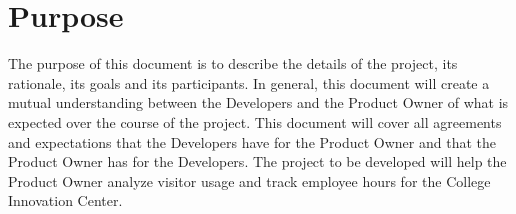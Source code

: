 \section{Purpose}

The purpose of this document is to describe the details of the project, its
rationale, its goals and its participants. In general, this document will create
a mutual understanding between the Developers and the Product Owner of what is
expected over the course of the project. This document will cover all agreements
and expectations that the Developers have for the Product Owner and that the
Product Owner has for the Developers. The project to be developed will help the
Product Owner analyze visitor usage and track employee hours for the College
Innovation Center.